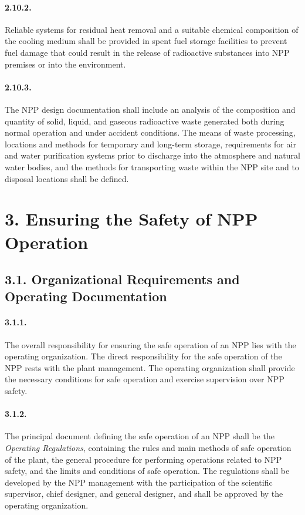 \documentclass[openright]{bookest}
\begin{document}
\paragraph{2.10.2.}
Reliable systems for residual heat removal and a suitable chemical composition of the cooling medium shall be provided in spent fuel storage facilities to prevent fuel damage that could result in the release of radioactive substances into NPP premises or into the environment.

\paragraph{2.10.3.}
The NPP design documentation shall include an analysis of the composition and quantity of solid, liquid, and gaseous radioactive waste generated both during normal operation and under accident conditions.  
The means of waste processing, locations and methods for temporary and long-term storage, requirements for air and water purification systems prior to discharge into the atmosphere and natural water bodies, and the methods for transporting waste within the NPP site and to disposal locations shall be defined.

\section*{3. Ensuring the Safety of NPP Operation}
\subsection*{3.1. Organizational Requirements and Operating Documentation}

\paragraph{3.1.1.}
The overall responsibility for ensuring the safe operation of an NPP lies with the operating organization.  
The direct responsibility for the safe operation of the NPP rests with the plant management.  
The operating organization shall provide the necessary conditions for safe operation and exercise supervision over NPP safety.

\paragraph{3.1.2.}
The principal document defining the safe operation of an NPP shall be the \textit{Operating Regulations}, containing the rules and main methods of safe operation of the plant, the general procedure for performing operations related to NPP safety, and the limits and conditions of safe operation.  
The regulations shall be developed by the NPP management with the participation of the scientific supervisor, chief designer, and general designer, and shall be approved by the operating organization.
\end{document}
